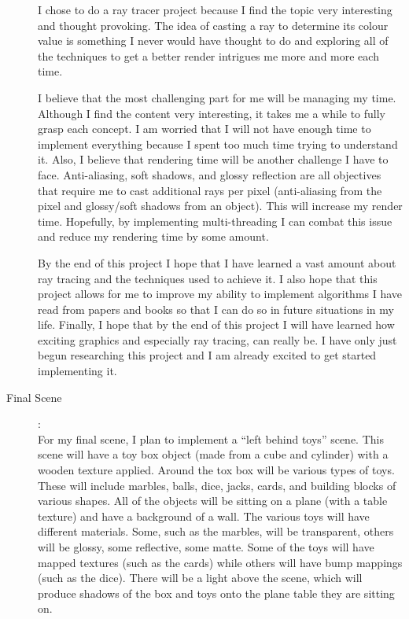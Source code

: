 \documentclass {article}
\begin{document}
\begin{description}
	I chose to do a ray tracer project because I find the topic very interesting and thought provoking. The idea of casting a ray to determine its colour value is something I never would have thought to do and exploring all of the techniques to get a better render intrigues me more and more each time.
	
	I believe that the most challenging part for me will be managing my time. Although I find the content very interesting, it takes me a while to fully grasp each concept. I am worried that I will not have enough time to implement everything because I spent too much time trying to understand it. Also, I believe that rendering time will be another challenge I have to face. Anti-aliasing, soft shadows, and glossy reflection are all objectives that require me to cast additional rays per pixel (anti-aliasing from the pixel and glossy/soft shadows from an object). This will increase my render time. Hopefully, by implementing multi-threading I can combat this issue and reduce my rendering time by some amount.
	
	By the end of this project I hope that I have learned a vast amount about ray tracing and the techniques used to achieve it. I also hope that this project allows for me to improve my ability to implement algorithms I have read from papers and books so that I can do so in future situations in my life. Finally, I hope that by the end of this project I will have learned how exciting graphics and especially ray tracing, can really be. I have only just begun researching this project and I am already excited to get started implementing it.
	
\item[Final Scene]:\\

	For my final scene, I plan to implement a ``left behind toys'' scene. This scene will have a toy box object (made from a cube and cylinder) with a wooden texture applied. Around the tox box will be various types of toys. These will include marbles, balls, dice, jacks, cards, and building blocks of various shapes. All of the objects will be sitting on a plane (with a table texture) and have a background of a wall. The various toys will have different materials. Some, such as the marbles, will be transparent, others will be glossy, some reflective, some matte. Some of the toys will have mapped textures (such as the cards) while others will have bump mappings (such as the dice). There will be a light above the scene, which will produce shadows of the box and toys onto the plane table they are sitting on. \newline
	

\end{description}
\end{document}
